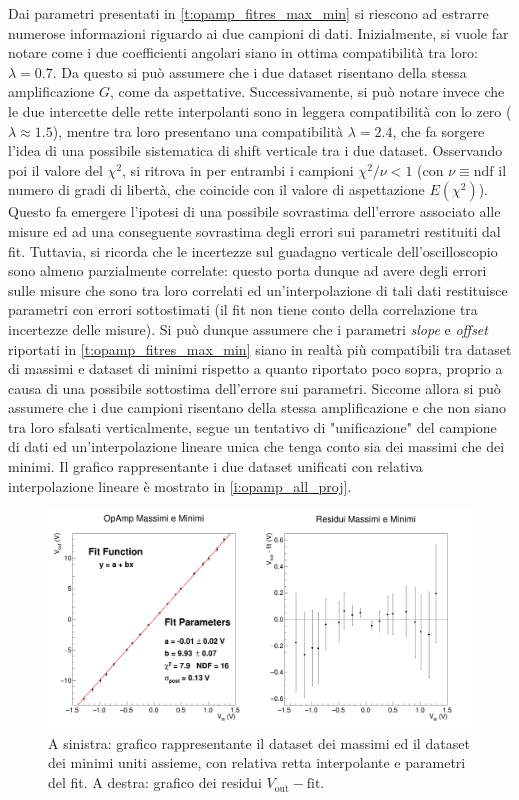 \documentclass[a4paper,11pt]{article} %
\begin{document}
\noindent Dai parametri presentati in  \autoref{t:opamp_fitres_max_min} si riescono ad estrarre numerose informazioni
riguardo ai due campioni di dati. Inizialmente, si vuole far notare come i due coefficienti angolari siano in ottima
compatibilità tra loro: $\lambda=0.7$. Da questo si può assumere che i due dataset risentano della stessa amplificazione
$G$, come da aspettative. Successivamente, si può notare invece che le due intercette delle rette interpolanti sono in
leggera compatibilità con lo zero ($\lambda \approx 1.5$), mentre tra loro presentano una compatibilità $\lambda=2.4$,
che fa sorgere l'idea di una possibile sistematica di shift verticale tra i due dataset. Osservando poi il valore del
$\chi^2$, si ritrova in per entrambi i campioni $\chi^2/\nu<1$ (con $\nu\equiv\text{ndf}$ il numero di gradi di libertà, che
coincide con il valore di aspettazione $E(\chi^2)$). Questo fa emergere l'ipotesi di una possibile sovrastima
dell'errore associato alle misure ed ad una conseguente sovrastima degli errori sui parametri restituiti dal fit.
Tuttavia, si ricorda che le incertezze sul guadagno verticale dell'oscilloscopio sono almeno parzialmente correlate:
questo porta dunque ad avere degli errori sulle misure che sono tra loro correlati ed un'interpolazione di tali dati
restituisce parametri con errori sottostimati (il fit non tiene conto della correlazione tra incertezze delle misure).
Si può dunque assumere che i parametri \textit{slope} e \textit{offset} riportati in \autoref{t:opamp_fitres_max_min}
siano in realtà più compatibili tra dataset di massimi e dataset di minimi rispetto a quanto riportato poco sopra,
proprio a causa di una possibile sottostima dell'errore sui parametri. Siccome allora si può assumere che i due campioni
risentano della stessa amplificazione e che non siano tra loro sfalsati verticalmente, segue un tentativo di
"unificazione" del campione di dati ed un'interpolazione lineare unica che tenga conto sia dei massimi che dei minimi.
Il grafico rappresentante i due dataset unificati con relativa interpolazione lineare è mostrato in
\autoref{i:opamp_all_proj}. 

\begin{figure}[H]
	\centering
	\includegraphics[width=15cm]{../Plots/Report_Plots/opamp_plot_all_projected.png}
	\caption{A sinistra: grafico rappresentante il dataset dei massimi ed il dataset dei minimi uniti assieme, 
	con relativa retta interpolante e parametri del fit. A destra: grafico dei residui $V_{\text{out}}-\text{fit}$.}
	\label{i:opamp_all_proj}
\end{figure}
\end{document}
